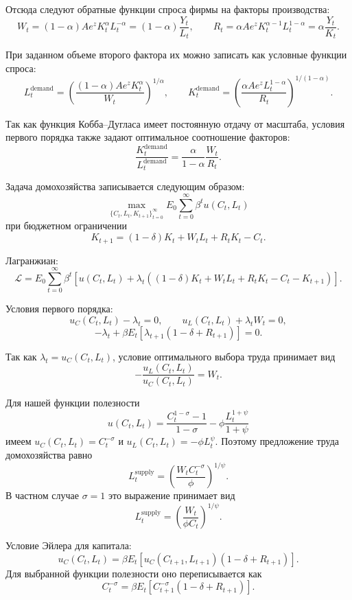 Отсюда следуют обратные функции спроса фирмы на факторы производства:
\[
    W_t
    =
    (1-\alpha)A e^z K_t^\alpha L_t^{-\alpha}
    =
    (1-\alpha)\frac{Y_t}{L_t},
    \qquad
    R_t
    =
    \alpha A e^z K_t^{\alpha-1}L_t^{1-\alpha}
    =
    \alpha\frac{Y_t}{K_t}.
\]

При заданном объеме второго фактора их можно записать как условные функции
спроса:
\[
    L_t^{\mathrm{demand}}
    =
    \left(
        \frac{(1-\alpha)A e^z K_t^\alpha}{W_t}
    \right)^{1/\alpha},
    \qquad
    K_t^{\mathrm{demand}}
    =
    \left(
        \frac{\alpha A e^z L_t^{1-\alpha}}{R_t}
    \right)^{1/(1-\alpha)}.
\]

Так как функция Кобба--Дугласа имеет постоянную отдачу от масштаба, условия
первого порядка также задают оптимальное соотношение факторов:
\[
    \frac{K_t^{\mathrm{demand}}}{L_t^{\mathrm{demand}}}
    =
    \frac{\alpha}{1-\alpha}\frac{W_t}{R_t}.
\]

Задача домохозяйства записывается следующим образом:
\[
    \max_{\{C_t,L_t,K_{t+1}\}_{t=0}^{\infty}}
    E_0 \sum_{t=0}^{\infty} \beta^t u(C_t,L_t)
\]
при бюджетном ограничении
\[
    K_{t+1}
    =
    (1-\delta)K_t
    +
    W_t L_t
    +
    R_t K_t
    -
    C_t.
\]

Лагранжиан:
\[
    \mathcal{L}
    =
    E_0 \sum_{t=0}^{\infty}
    \beta^t
    \left[
        u(C_t,L_t)
        +
        \lambda_t
        \left(
            (1-\delta)K_t + W_tL_t + R_tK_t - C_t - K_{t+1}
        \right)
    \right].
\]

Условия первого порядка:
\[
    u_C(C_t,L_t)-\lambda_t=0,
    \qquad
    u_L(C_t,L_t)+\lambda_t W_t=0,
\]
\[
    -\lambda_t
    +
    \beta E_t
    \left[
        \lambda_{t+1}(1-\delta+R_{t+1})
    \right]
    =
    0.
\]

Так как $\lambda_t=u_C(C_t,L_t)$, условие оптимального выбора труда принимает вид
\[
    -\frac{u_L(C_t,L_t)}{u_C(C_t,L_t)}
    =
    W_t.
\]

Для нашей функции полезности
\[
    u(C_t,L_t)
    =
    \frac{C_t^{1-\sigma}-1}{1-\sigma}
    -
    \phi\frac{L_t^{1+\psi}}{1+\psi}
\]
имеем $u_C(C_t,L_t)=C_t^{-\sigma}$ и $u_L(C_t,L_t)=-\phi L_t^\psi$. Поэтому
предложение труда домохозяйства равно
\[
    L_t^{\mathrm{supply}}
    =
    \left(
        \frac{W_t C_t^{-\sigma}}{\phi}
    \right)^{1/\psi}.
\]
В частном случае $\sigma=1$ это выражение принимает вид
\[
    L_t^{\mathrm{supply}}
    =
    \left(
        \frac{W_t}{\phi C_t}
    \right)^{1/\psi}.
\]

Условие Эйлера для капитала:
\[
    u_C(C_t,L_t)
    =
    \beta E_t
    \left[
        u_C(C_{t+1},L_{t+1})
        (1-\delta+R_{t+1})
    \right].
\]
Для выбранной функции полезности оно переписывается как
\[
    C_t^{-\sigma}
    =
    \beta E_t
    \left[
        C_{t+1}^{-\sigma}(1-\delta+R_{t+1})
    \right].
\]

